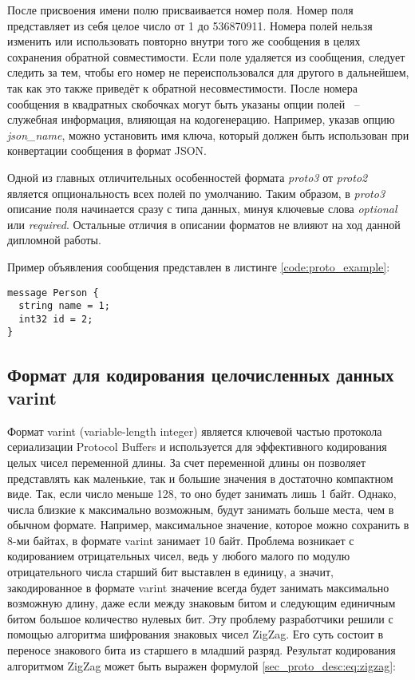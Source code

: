 После присвоения имени полю присваивается номер поля. Номер поля представляет из себя целое число от 1 до 536870911.
Номера полей нельзя изменить или использовать повторно внутри того же сообщения в целях сохранения обратной совместимости.
Если поле удаляется из сообщения, следует следить за тем, чтобы его номер не переиспользовался для другого в дальнейшем, так как это также приведёт к обратной несовместимости.
После номера сообщения в квадратных скобочках могут быть указаны опции полей ~--~ служебная информация, влияющая на кодогенерацию. Например, указав опцию \textit{json\_name}, можно установить имя ключа, который должен быть использован при конвертации сообщения в формат JSON.

Одной из главных отличительных особенностей формата \textit{proto3} от \textit{proto2} является опциональность всех полей по умолчанию.
Таким образом, в \textit{proto3} описание поля начинается сразу с типа данных, минуя ключевые слова \textit{optional} или \textit{required}.
Остальные отличия в описании форматов не влияют на ход данной дипломной работы.

Пример объявления сообщения представлен в листинге \ref{code:proto_example}:

\begin{lstlisting}[style=CodeListing, label=code:proto_example, caption={Пример простейшего protobuf-сообщения}]
message Person {
  string name = 1;
  int32 id = 2;
}
\end{lstlisting}

\subsection{Формат для кодирования целочисленных данных varint}
Формат varint (variable-length integer) является ключевой частью протокола сериализации Protocol Buffers 
и используется для эффективного кодирования целых чисел переменной длины. За счет переменной длины он позволяет 
представлять как маленькие, так и большие значения в достаточно компактном виде.
Так, если число меньше 128, то оно будет занимать лишь 1 байт. Однако, числа близкие к максимально возможным, 
будут занимать больше места, чем в обычном формате.
Например, максимальное значение, которое можно сохранить в 8-ми байтах, в формате varint занимает 10 байт.
Проблема возникает с кодированием отрицательных чисел, ведь у любого малого по модулю отрицательного числа старший бит выставлен в единицу, а значит,
закодированное в формате varint значение всегда будет занимать максимально возможную длину, даже если между знаковым битом и следующим единичным битом 
большое количество нулевых бит. Эту проблему разработчики решили с помощью алгоритма шифрования знаковых чисел ZigZag. Его суть состоит в переносе знакового бита
из старшего в младший разряд. Результат кодирования алгоритмом ZigZag может быть выражен формулой \ref{sec_proto_desc:eq:zigzag}:

